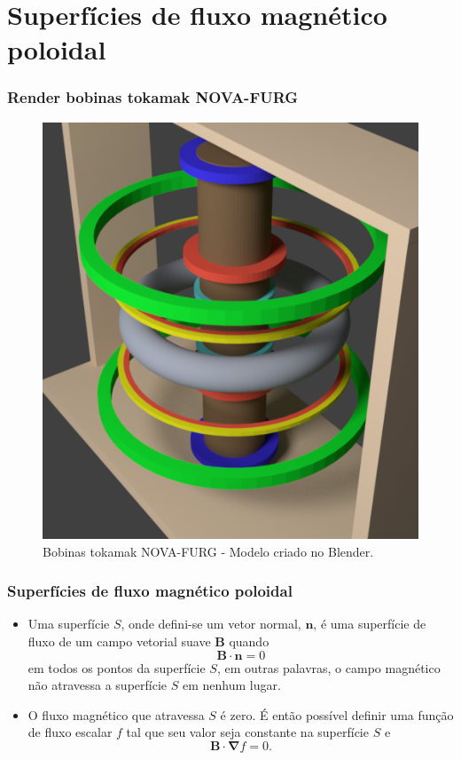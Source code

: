 \documentclass[aspectratio=169]{beamer}
\begin{document}
\section{Superfícies de fluxo magnético poloidal}
\begin{frame}		
\frametitle{Render bobinas tokamak NOVA-FURG}
\begin{figure}[H]
\centering
\includegraphics[width=.37\linewidth]{bob2.png}  
\caption{Bobinas tokamak NOVA-FURG - Modelo criado no Blender.}
\end{figure}
\end{frame}
\begin{frame}		
\frametitle{ Superfícies de fluxo magnético poloidal }
\begin{itemize}
\item Uma superfície $S$, onde defini-se um vetor normal, $\bm{n}$, é uma superfície de fluxo de um campo vetorial suave $\bm{B}$ quando
\begin{equation}
\bm{B} \cdot \bm{n}= 0 
\end{equation}
em todos os pontos da superfície $S$, em outras palavras, o campo magnético não atravessa a superfície $S$ em nenhum lugar. 
\item O fluxo magnético que atravessa $S$ é zero. É então possível definir uma função de fluxo escalar $f$ tal que seu valor seja constante na superfície $S$ e
\begin{equation}
\bm{B} \cdot \bm{\nabla} f = 0.
\end{equation}
\end{itemize}
\end{frame}
\end{document}
